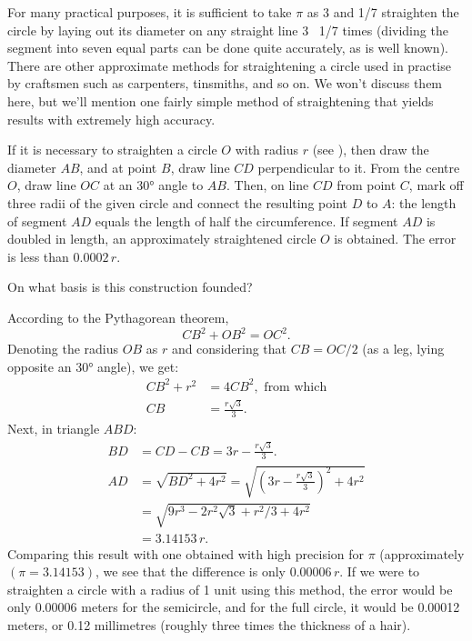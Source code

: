 For many practical purposes, it is sufficient to take $\pi$ as 3 and  1/7 straighten the circle by laying out its diameter on any straight line 3 \, 1/7 times (dividing the segment into seven equal parts can be done quite accurately, as is well known). There are other approximate methods for straightening a circle used in practise by craftsmen such as carpenters, tinsmiths, and so on. We won't discuss them here, but we'll mention one fairly simple method of straightening that yields results with extremely high accuracy.



If it is necessary to straighten a circle $O$ with radius $r$ (see ), then draw the diameter $AB$, and at point $B$, draw line $CD$ perpendicular to it. From the centre $O$, draw line $OC$ at an \ang{30} angle to $AB$. Then, on line $CD$ from point $C$, mark off three radii of the given circle and connect the resulting point $D$ to $A$: the length of segment $AD$ equals the length of half the circumference. If segment $AD$ is doubled in length, an approximately straightened circle $O$ is obtained. The error is less than $0.0002\, r$.

On what basis is this construction founded?

\ans According to the Pythagorean theorem, 
\begin{equation*}%
CB^{2} + OB^{2} = OC^{2}.
\end{equation*}
Denoting the radius $OB$ as $r$ and considering that $CB = OC/2$ (as a leg, lying opposite an \ang{30} angle), we get: 
\begin{align*}%
CB^{2} + r^{2}  & = 4CB^{2}, \,\, \text{from which}\\
CB & = \frac{r \sqrt{3}}{3}.
\end{align*}
Next, in triangle $ABD$:
\begin{align*}%
BD & =  CD - CB = 3r - \frac{r\sqrt{3}}{3}.\\
AD & = \sqrt{BD^{2} + 4r^{2}} = \sqrt{\left( 3r - \frac{r \sqrt{3}}{3} \right)^{2} + 4r^{2}} \\
& = \sqrt{9r^{3} - 2r^{2}\sqrt{3} + r^{2}/3 + 4r^{2}} \\
& = 3.14153\, r.
\end{align*}
Comparing this result with one obtained with high precision for $\pi$ (approximately $( \pi = 3.14153)$, we see that the difference is only $0.00006\, r$. If we were to straighten a circle with a radius of 1 unit using this method, the error would be only 0.00006 meters for the semicircle, and for the full circle, it would be 0.00012 meters, or 0.12 millimetres (roughly three times the thickness of a hair).


